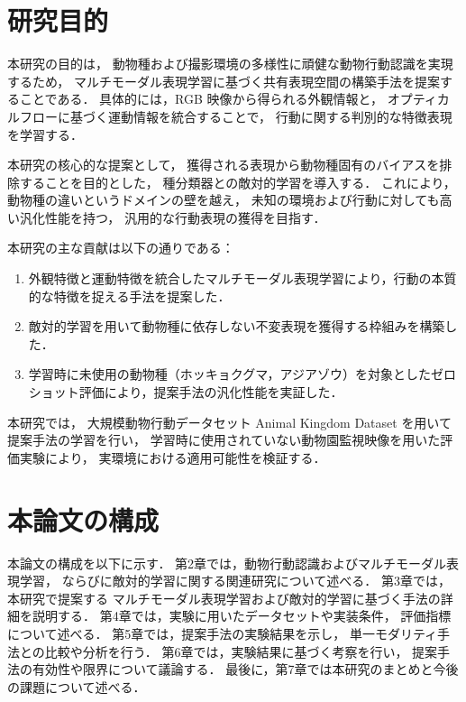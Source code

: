 \section{研究目的}
本研究の目的は，
動物種および撮影環境の多様性に頑健な動物行動認識を実現するため，
マルチモーダル表現学習に基づく共有表現空間の構築手法を提案することである．
具体的には，RGB 映像から得られる外観情報と，
オプティカルフローに基づく運動情報を統合することで，
行動に関する判別的な特徴表現を学習する．

本研究の核心的な提案として，
獲得される表現から動物種固有のバイアスを排除することを目的とした，
種分類器との敵対的学習を導入する．
これにより，動物種の違いというドメインの壁を越え，
未知の環境および行動に対しても高い汎化性能を持つ，
汎用的な行動表現の獲得を目指す．

本研究の主な貢献は以下の通りである：
\begin{enumerate}
  \item 外観特徴と運動特徴を統合したマルチモーダル表現学習により，行動の本質的な特徴を捉える手法を提案した．
  \item 敵対的学習を用いて動物種に依存しない不変表現を獲得する枠組みを構築した．
  \item 学習時に未使用の動物種（ホッキョクグマ，アジアゾウ）を対象としたゼロショット評価により，提案手法の汎化性能を実証した．
\end{enumerate}

本研究では，
大規模動物行動データセット Animal Kingdom Dataset \cite{ng2022animal} を用いて提案手法の学習を行い，
学習時に使用されていない動物園監視映像を用いた評価実験により，
実環境における適用可能性を検証する．

\section{本論文の構成}

本論文の構成を以下に示す．
第2章では，動物行動認識およびマルチモーダル表現学習，
ならびに敵対的学習に関する関連研究について述べる．
第3章では，本研究で提案する
マルチモーダル表現学習および敵対的学習に基づく手法の詳細を説明する．
第4章では，実験に用いたデータセットや実装条件，
評価指標について述べる．
第5章では，提案手法の実験結果を示し，
単一モダリティ手法との比較や分析を行う．
第6章では，実験結果に基づく考察を行い，
提案手法の有効性や限界について議論する．
最後に，第7章では本研究のまとめと今後の課題について述べる．